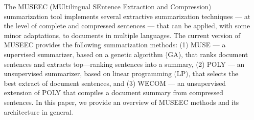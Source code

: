 The MUSEEC (MUltilingual SEntence Extraction and Compression) summarization tool implements several extractive summarization techniques --- at the level of complete and compressed sentences --- that can be applied, with some minor adaptations, to documents in multiple languages. The current version of MUSEEC provides the following summarization methods: (1) MUSE --- a supervised summarizer, based on a genetic algorithm (GA), that ranks document sentences and extracts top---ranking sentences into a summary, (2) POLY --- an unsupervised summarizer, based on linear programming (LP), that selects the best extract of document sentences, and (3) WECOM --- an unsupervised extension of POLY that compiles a document summary from compressed sentences. In this paper, we provide an overview of MUSEEC methods and its architecture in general.
